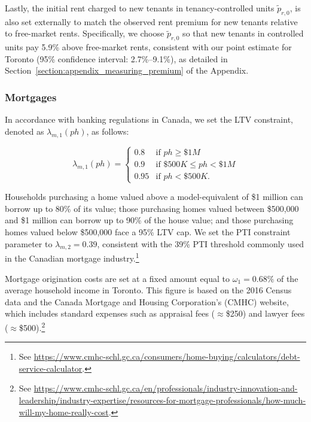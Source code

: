 \documentclass[parskip=full]{article}
\begin{document}

Lastly, the initial rent charged to new tenants in tenancy-controlled units $\tilde{p}_{r,0}$, is also set externally to match the observed rent premium for new tenants relative to free-market rents. Specifically, we choose $\tilde{p}_{r,0}$ so that new tenants in controlled units pay 5.9\% above free-market rents, consistent with our point estimate for Toronto (95\% confidence interval: 2.7\%–9.1\%), as detailed in Section~\ref{section:appendix_measuring_premium} of the Appendix.

\subsubsection{Mortgages}

In accordance with banking regulations in Canada, we set the LTV constraint, denoted as $\lambda_{m,1}(ph)$, as follows:

\begin{equation*}
\lambda_{m,1}(ph) = \begin{cases}
0.8 &\text{if $ph\geq \$1M$}\\
0.9 &\text{if $\$500K\leq ph< \$1M$}\\
0.95 &\text{if $ph < \$500K$}.
\end{cases}
\end{equation*}

\noindent Households purchasing a home valued above a model-equivalent of \$1 million can borrow up to 80\% of its value; those purchasing homes valued between \$500,000 and \$1 million can borrow up to 90\% of the house value; and those purchasing homes valued below \$500,000 face a 95\% LTV cap. We set the PTI constraint parameter to $\lambda_{m,2}=0.39$, consistent with the 39\% PTI threshold commonly used in the Canadian mortgage industry.\footnote{See \url{https://www.cmhc-schl.gc.ca/consumers/home-buying/calculators/debt-service-calculator}.}

Mortgage origination costs are set at a fixed amount equal to $\omega_{1}=0.68\%$ of the average household income in Toronto. This figure is based on the 2016 Census data and the Canada Mortgage and Housing Corporation's (CMHC) website, which includes standard expenses such as appraisal fees ($\approx$\$250) and lawyer fees ($\approx$\$500).\footnote{See \url{https://www.cmhc-schl.gc.ca/en/professionals/industry-innovation-and-leadership/industry-expertise/resources-for-mortgage-professionals/how-much-will-my-home-really-cost}.}
\end{document}
